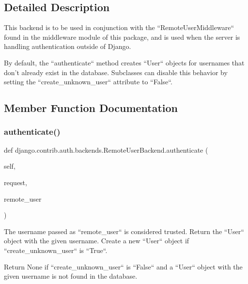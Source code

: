 \subsection{Detailed Description}
\begin{DoxyVerb}This backend is to be used in conjunction with the ``RemoteUserMiddleware``
found in the middleware module of this package, and is used when the server
is handling authentication outside of Django.

By default, the ``authenticate`` method creates ``User`` objects for
usernames that don't already exist in the database.  Subclasses can disable
this behavior by setting the ``create_unknown_user`` attribute to
``False``.
\end{DoxyVerb}
 

\subsection{Member Function Documentation}
\mbox{\label{classdjango_1_1contrib_1_1auth_1_1backends_1_1_remote_user_backend_ac8cf8664a101ff979ca3d3c4ff6f7bc7}} 
\subsubsection{\texorpdfstring{authenticate()}{authenticate()}}
{\footnotesize\ttfamily def django.\+contrib.\+auth.\+backends.\+Remote\+User\+Backend.\+authenticate (\begin{DoxyParamCaption}\item[{}]{self,  }\item[{}]{request,  }\item[{}]{remote\+\_\+user }\end{DoxyParamCaption})}

\begin{DoxyVerb}The username passed as ``remote_user`` is considered trusted. Return
the ``User`` object with the given username. Create a new ``User``
object if ``create_unknown_user`` is ``True``.

Return None if ``create_unknown_user`` is ``False`` and a ``User``
object with the given username is not found in the database.
\end{DoxyVerb}
 \mbox{\label{classdjango_1_1contrib_1_1auth_1_1backends_1_1_remote_user_backend_a9f9b271e93cc575b10dfa0a132addf3f}} 
